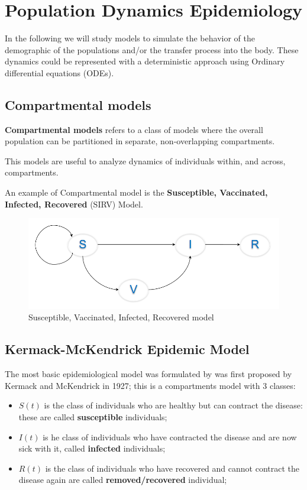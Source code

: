 \chapter{Population Dynamics Epidemiology}
In the following we will study models to simulate the behavior of the
demographic of the populations and/or the transfer process into the 
body. These dynamics could be represented with a deterministic approach
using Ordinary differential equations (ODEs).
\section{Compartmental models}
\textbf{Compartmental models} refers to a class of models where the 
overall population can be partitioned in separate, non-overlapping 
compartments.

This models are useful to analyze dynamics of individuals within, and 
across, compartments.

An example of Compartmental model is the \textbf{Susceptible, Vaccinated, 
Infected, Recovered} (SIRV) Model.

\begin{figure}[!ht]
    \centering
    \includegraphics[width=0.5\linewidth]{img/SIRV.png}
    \caption{Susceptible, Vaccinated, Infected, Recovered model}
    \label{fig:sirv}
\end{figure}

\section{Kermack-McKendrick Epidemic Model}
The most basic epidemiological model was formulated by was first proposed 
by Kermack and McKendrick in 1927; this is a compartments model with 3 
classes:
\begin{itemize}
    \item $S(t)$ is the class of individuals who are healthy but can 
        contract the disease: these are called \textbf{susceptible} individuals;
    \item $I(t)$ is he class of individuals who have contracted the 
        disease and are now sick with it, called \textbf{infected} individuals;
    \item $R(t)$ is the class of individuals who have recovered and 
        cannot contract the disease again are called \textbf{removed/recovered} 
        individual;
\end{itemize}

